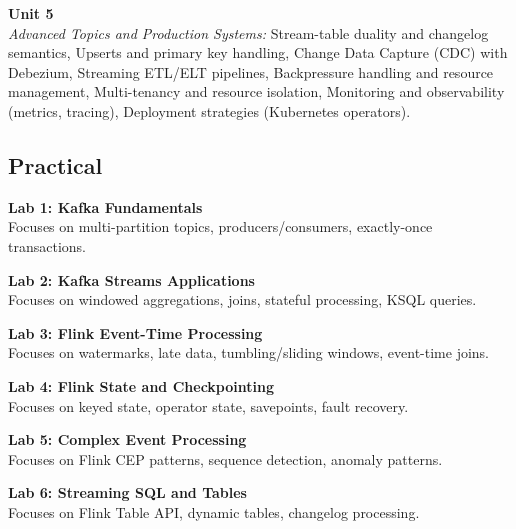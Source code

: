 \vspace{0.3cm}

\noindent\textbf{Unit 5} \\
\textit{Advanced Topics and Production Systems:} Stream-table duality and changelog semantics, Upserts and primary key handling, Change Data Capture (CDC) with Debezium, Streaming ETL/ELT pipelines, Backpressure handling and resource management, Multi-tenancy and resource isolation, Monitoring and observability (metrics, tracing), Deployment strategies (Kubernetes operators).

\newpage

\subsection*{Practical}
\noindent\textbf{Lab 1: Kafka Fundamentals} \\
Focuses on multi-partition topics, producers/consumers, exactly-once transactions.

\vspace{0.2cm}

\noindent\textbf{Lab 2: Kafka Streams Applications} \\
Focuses on windowed aggregations, joins, stateful processing, KSQL queries.

\vspace{0.2cm}

\noindent\textbf{Lab 3: Flink Event-Time Processing} \\
Focuses on watermarks, late data, tumbling/sliding windows, event-time joins.

\vspace{0.2cm}

\noindent\textbf{Lab 4: Flink State and Checkpointing} \\
Focuses on keyed state, operator state, savepoints, fault recovery.

\vspace{0.2cm}

\noindent\textbf{Lab 5: Complex Event Processing} \\
Focuses on Flink CEP patterns, sequence detection, anomaly patterns.

\vspace{0.2cm}

\noindent\textbf{Lab 6: Streaming SQL and Tables} \\
Focuses on Flink Table API, dynamic tables, changelog processing.

\vspace{0.2cm}

